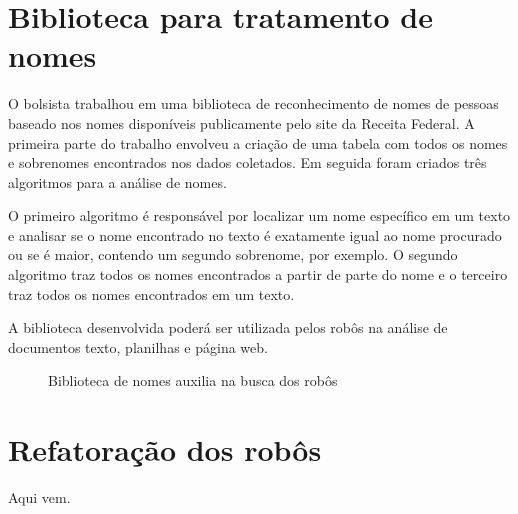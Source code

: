 \documentclass[12pt]{report}
\begin{document}
\section{Biblioteca para tratamento de nomes}
O bolsista trabalhou em uma biblioteca de reconhecimento de nomes de pessoas baseado nos nomes disponíveis publicamente pelo site da Receita Federal. A primeira parte do trabalho envolveu a criação de uma tabela com todos os nomes e sobrenomes encontrados nos dados coletados. Em seguida foram criados três algoritmos para a análise de nomes.

O primeiro algoritmo é responsável por localizar um nome específico em um texto e analisar se o nome encontrado no texto é exatamente igual ao nome procurado ou se é maior, contendo um segundo sobrenome, por exemplo. O segundo algoritmo traz todos os nomes encontrados a partir de parte do nome e o terceiro traz todos os nomes encontrados em um texto.

A biblioteca desenvolvida poderá ser utilizada pelos robôs na análise de documentos texto, planilhas e página web.

\begin{figure}[h!]
\centering
{}
\caption{Biblioteca de nomes auxilia na busca dos robôs}
\label{fig:biblioteca}
\end{figure}

\section{Refatoração dos robôs}
Aqui vem.
\end{document}
